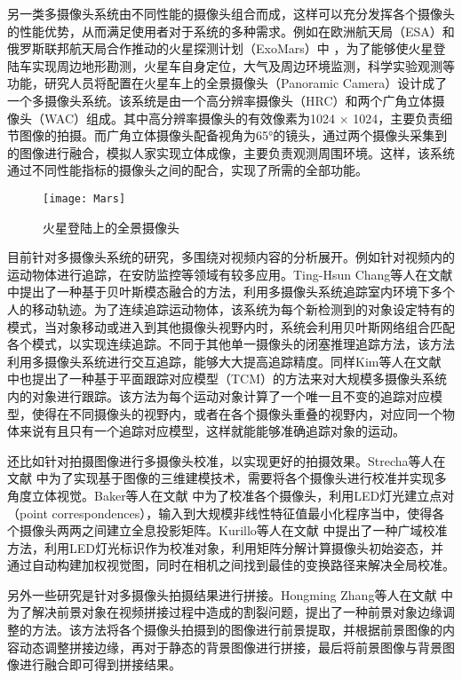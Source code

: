 另一类多摄像头系统由不同性能的摄像头组合而成，这样可以充分发挥各个摄像头的性能优势，从而满足使用者对于系统的多种需求。例如在欧洲航天局（ESA）和俄罗斯联邦航天局合作推动的火星探测计划（ExoMars）中 \cite{9, 10}，为了能够使火星登陆车实现周边地形勘测，火星车自身定位，大气及周边环境监测，科学实验观测等功能，研究人员将配置在火星车上的全景摄像头（Panoramic Camera）设计成了一个多摄像头系统。该系统是由一个高分辨率摄像头（HRC）和两个广角立体摄像头（WAC）组成。其中高分辨率摄像头的有效像素为1024 × 1024，主要负责细节图像的拍摄。而广角立体摄像头配备视角为65°的镜头，通过两个摄像头采集到的图像进行融合，模拟人家实现立体成像，主要负责观测周围环境。这样，该系统通过不同性能指标的摄像头之间的配合，实现了所需的全部功能。

\begin{figure}[h] 
  \centering
  \texttt{[image: Mars]}
  \caption{火星登陆上的全景摄像头}
  \label{Mars}
\end{figure}

目前针对多摄像头系统的研究，多围绕对视频内容的分析展开。例如针对视频内的运动物体进行追踪，在安防监控等领域有较多应用。Ting-Hsun Chang等人在文献 \cite{11} 中提出了一种基于贝叶斯模态融合的方法，利用多摄像头系统追踪室内环境下多个人的移动轨迹。为了连续追踪运动物体，该系统为每个新检测到的对象设定特有的模式，当对象移动或进入到其他摄像头视野内时，系统会利用贝叶斯网络组合匹配各个模式，以实现连续追踪。不同于其他单一摄像头的闭塞推理追踪方法，该方法利用多摄像头系统进行交互追踪，能够大大提高追踪精度。同样Kim等人在文献 \cite{12} 中也提出了一种基于平面跟踪对应模型（TCM）的方法来对大规模多摄像头系统内的对象进行跟踪。该方法为每个运动对象计算了一个唯一且不变的追踪对应模型，使得在不同摄像头的视野内，或者在各个摄像头重叠的视野内，对应同一个物体来说有且只有一个追踪对应模型，这样就能能够准确追踪对象的运动。

还比如针对拍摄图像进行多摄像头校准，以实现更好的拍摄效果。Strecha等人在文献 \cite{13} 中为了实现基于图像的三维建模技术，需要将各个摄像头进行校准并实现多角度立体视觉。Baker等人在文献 \cite{14} 中为了校准各个摄像头，利用LED灯光建立点对（point correspondences），输入到大规模非线性特征值最小化程序当中，使得各个摄像头两两之间建立全息投影矩阵。Kurillo等人在文献 \cite{15} 中提出了一种广域校准方法，利用LED灯光标识作为校准对象，利用矩阵分解计算摄像头初始姿态，并通过自动构建加权视觉图，同时在相机之间找到最佳的变换路径来解决全局校准。

另外一些研究是针对多摄像头拍摄结果进行拼接。Hongming Zhang等人在文献 \cite{16} 中为了解决前景对象在视频拼接过程中造成的割裂问题，提出了一种前景对象边缘调整的方法。该方法将各个摄像头拍摄到的图像进行前景提取，并根据前景图像的内容动态调整拼接边缘，再对于静态的背景图像进行拼接，最后将前景图像与背景图像进行融合即可得到拼接结果。

